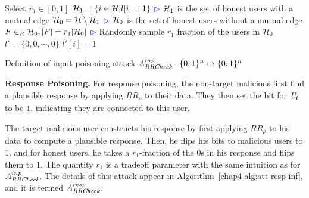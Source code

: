 \begin{algorithm}[bt]
Select $r_1\in [0,1]$\;
$\mathcal{H}_1=\{i \in \mathcal{H}| l[i]=1\}$\;
\hfill\textcolor{blue}{$\rhd$} $\mathcal{H}_1$ is the set of honest users with a mutual edge\;
$\mathcal{H}_0=\mathcal{H}\setminus\mathcal{H}_1$\;
\hfill\textcolor{blue}{$\rhd$} $\mathcal{H}_0$ is the set of honest users without a mutual edge\;
$F\in_R \mathcal{H}_0, |F|=r_1|\mathcal{H}_0|$\;
\hfill\textcolor{blue}{$\rhd$} Randomly sample $r_1$ fraction of the users in $\mathcal{H}_0$\;
$l'=\{0,0,\cdots, 0\}$\;
 {
$l'[i]=1$ \;
}
  \caption[Definition of input poisoning attack $A_{\DegRRCheck}^{inp}$.]{Definition of input poisoning attack $A_{\textit{RRCheck}}^{inp}: \{0,1\}^n\mapsto\{0,1\}^n$ }\label{chap4-alg:att-input-inf}
\end{algorithm}
\noindent \textbf{Response Poisoning.}  For response poisoning, the non-target malicious first find a plausible response by applying $RR_\rho$ to their data. They then set the bit for $\textit{U}_t$ to be $1$, indicating they are connected to this user.

The target malicious user constructs his response by first applying $RR_\rho$ to his data to compute a plausible response. Then, he flips his bits to malicious users to $1$, and for honest users, he takes a $r_1$-fraction of the $0$s in his response and flips them to $1$. The quantity $r_1$ is a tradeoff parameter with the same intuition as for $A_{\DegRRCheck}^{inp}$. The details of this attack appear in Algorithm~\ref{chap4-alg:att-resp-inf}, and it is termed $A_{\textit{RRCheck}}^{resp}$.

%  
%  
%

